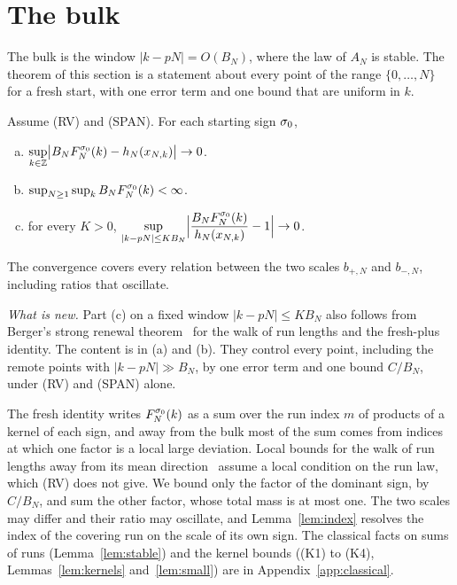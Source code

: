 \section{The bulk}\label{sec:bulk}

The bulk is the window $|k-pN|=O(B_N)$, where the law of $A_N$ is stable. The
theorem of this section is a statement about every point of the range
$\{0,\dots,N\}$ for a fresh
start, with one error term and one bound that are uniform in $k$.

\begin{introtheorem}\label{thm:bulk}
Assume (RV) and (SPAN). For each starting sign $\sigma_0$,
\begin{enumerate}[(a)]
\item $\displaystyle\sup_{k\in\mathbb{Z}}\bigl|B_NF^{\sigma_0}_N(k)-h_N(x_{N,k})\bigr|\to0$.
\item $\sup_{N\ge1}\sup_kB_NF^{\sigma_0}_N(k)<\infty$.
\item for every $K>0$, $\displaystyle\sup_{|k-pN|\le KB_N}\Bigl|\frac{B_NF^{\sigma_0}_N(k)}{h_N(x_{N,k})}-1\Bigr|\to0$.
\end{enumerate}
The convergence covers every relation between the two scales $b_{\plus,N}$ and
$b_{\minus,N}$, including ratios that oscillate.
\end{introtheorem}

\emph{What is new.} Part (c) on a fixed window $|k-pN|\le KB_N$ also follows
from Berger's strong renewal theorem~\cite[Theorem~3.3]{berger2019} for the walk
of run lengths and the fresh-plus identity. The content is in (a) and (b). They
control every point, including the remote points with $|k-pN|\gg B_N$, by one
error term and one bound $C/B_N$, under (RV) and (SPAN) alone.

The fresh identity writes $F^{\sigma_0}_N(k)$ as a sum over the run index $m$ of
products of a kernel of each sign, and away from the bulk most of the sum comes
from indices at which one factor is a local large deviation. Local bounds for the
walk of run lengths away from its mean direction~\cite[Theorems~4.1 to~4.3]{berger2019}
assume a local condition on the run law, which (RV) does not give. We bound only
the factor of the dominant sign, by $C/B_N$, and sum the other factor, whose total
mass is at most one. The two scales may differ and their ratio may oscillate, and
Lemma~\ref{lem:index} resolves the index of the covering run on the scale of its
own sign. The classical facts on sums of runs (Lemma~\ref{lem:stable}) and the
kernel bounds ((K1) to (K4), Lemmas~\ref{lem:kernels} and~\ref{lem:small}) are in
Appendix~\ref{app:classical}.

